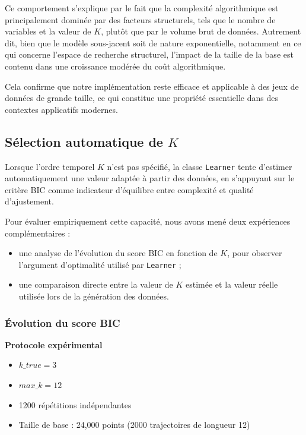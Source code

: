 \documentclass{article}
\begin{document}
Ce comportement s'explique par le fait que la complexité algorithmique est principalement dominée par des facteurs
structurels, tels que le nombre de variables et la valeur de $K$, plutôt que par le volume brut de données. Autrement dit,
bien que le modèle sous-jacent soit de nature exponentielle, notamment en ce qui concerne l'espace de recherche structurel,
l'impact de la taille de la base est contenu dans une croissance modérée du coût algorithmique.

Cela confirme que notre implémentation reste efficace et applicable à des jeux de données de grande taille, ce qui
constitue une propriété essentielle dans des contextes applicatifs modernes.


\subsection{Sélection automatique de $K$}

Lorsque l'ordre temporel $K$ n'est pas spécifié, la classe \texttt{Learner} tente
d'estimer automatiquement une valeur adaptée à partir des données, en s'appuyant
sur le critère BIC comme indicateur d'équilibre entre complexité et qualité d'ajustement.

Pour évaluer empiriquement cette capacité, nous avons mené deux expériences
complémentaires :

\begin{itemize}
    \item une analyse de l'évolution du score BIC en fonction de $K$, pour observer
          l'argument d'optimalité utilisé par \texttt{Learner} ;
    \item une comparaison directe entre la valeur de $K$ estimée et la valeur réelle
          utilisée lors de la génération des données.
\end{itemize}


\subsubsection{Évolution du score BIC}

\textbf{Protocole expérimental}

\begin{itemize}
    \item $k\_true = 3$
    \item $max\_k = 12$
    \item 1200 répétitions indépendantes
    \item Taille de base : 24,000 points (2000 trajectoires de longueur 12)
\end{itemize}
\end{document}
